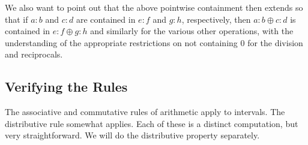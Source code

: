 \documentclass[12pt]{article}
\begin{document}
We also want to point out that the above pointwise containment then extends so that if $a:b$ and $c:d$ are contained in $e:f$ and $g:h$, respectively, then $a:b \oplus c:d $ is contained in $e:f \oplus g:h$ and similarly for the various other operations, with the understanding of the appropriate restrictions on not containing 0 for the division and reciprocals. 


\subsection{Verifying the Rules}\label{sec:rules}

The associative and commutative rules of arithmetic apply to intervals. The distributive rule somewhat applies. Each of these is a distinct computation, but very straightforward. We will do the distributive property separately. 
\end{document}
